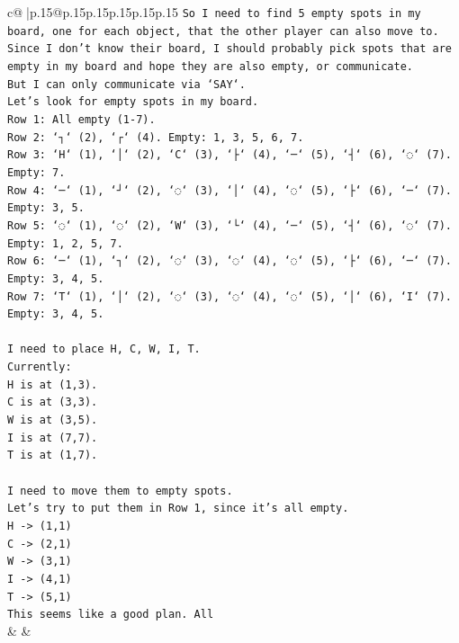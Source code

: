 \documentclass{article}
\begin{document}
{\begin{supertabular}{c@{$\;$}|p{.15\linewidth}@{}p{.15\linewidth}p{.15\linewidth}p{.15\linewidth}p{.15\linewidth}p{.15\linewidth}}
{{{\texttt{So I need to find 5 empty spots in my board, one for each object, that the other player can also move to.} \\
\texttt{Since I don't know their board, I should probably pick spots that are empty in my board and hope they are also empty, or communicate.} \\
\texttt{But I can only communicate via `SAY`.} \\
\texttt{Let's look for empty spots in my board.} \\
\texttt{Row 1: All empty (1{-}7).} \\
\texttt{Row 2: `┐` (2), `┌` (4). Empty: 1, 3, 5, 6, 7.} \\
\texttt{Row 3: `H` (1), `│` (2), `C` (3), `├` (4), `─` (5), `┤` (6), `◌` (7). Empty: 7.} \\
\texttt{Row 4: `─` (1), `┘` (2), `◌` (3), `│` (4), `◌` (5), `├` (6), `─` (7). Empty: 3, 5.} \\
\texttt{Row 5: `◌` (1), `◌` (2), `W` (3), `└` (4), `─` (5), `┤` (6), `◌` (7). Empty: 1, 2, 5, 7.} \\
\texttt{Row 6: `─` (1), `┐` (2), `◌` (3), `◌` (4), `◌` (5), `├` (6), `─` (7). Empty: 3, 4, 5.} \\
\texttt{Row 7: `T` (1), `│` (2), `◌` (3), `◌` (4), `◌` (5), `│` (6), `I` (7). Empty: 3, 4, 5.} \\
\\ 
\texttt{I need to place H, C, W, I, T.} \\
\texttt{Currently:} \\
\texttt{H is at (1,3).} \\
\texttt{C is at (3,3).} \\
\texttt{W is at (3,5).} \\
\texttt{I is at (7,7).} \\
\texttt{T is at (1,7).} \\
\\ 
\texttt{I need to move them to empty spots.} \\
\texttt{Let's try to put them in Row 1, since it's all empty.} \\
\texttt{H {-}> (1,1)} \\
\texttt{C {-}> (2,1)} \\
\texttt{W {-}> (3,1)} \\
\texttt{I {-}> (4,1)} \\
\texttt{T {-}> (5,1)} \\
\texttt{This seems like a good plan. All} \\
            }
        }
    }
    & & \\ \\


\end{supertabular}}
\end{document}
